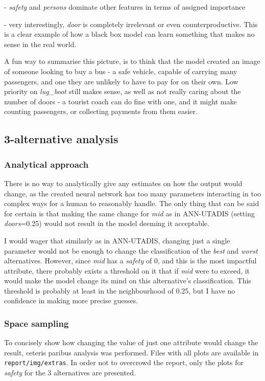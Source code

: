 \documentclass[../main.tex]{subfiles}
\begin{document}
- \emph{safety} and \emph{persons} dominate other features in terms of assigned importance

- very interestingly, \emph{door} is completely irrelevant or even counterproductive. This is
a clear example of how a black box model can learn something that makes no sense in the real world.

A fun way to summarise this picture, is to think that the model created an image of someone
looking to buy a bus - a safe vehicle, capable of carrying many passengers, and one they are
unlikely to have to pay for on their own. Low priority on \emph{lug\_boot} still makes sense,
as well as not really caring about the number of doors - a tourist coach can do fine with one,
and it might make counting passengers, or collecting payments from them easier.

\subsection{3-alternative analysis}

\subsubsection{Analytical approach}

There is no way to analytically give any estimates on how the output would change,
as the created neural network has too many parameters interacting in too complex
ways for a human to reasonably handle. The only thing that can be said for certain
is that making the same change for \emph{mid} as in ANN-UTADIS (setting \emph{doors}=0.25)
would not result in the model deeming it acceptable.

I would wager that similarly as in ANN-UTADIS, changing just a single parameter would not
be enough to change the classification of the \emph{best} and \emph{worst} alternatives.
However, since \emph{mid} has a \emph{safety} of 0, and this is the most impactful attribute,
there probably exists a threshold on it that if \emph{mid} were to exceed, it
would make the model change its mind on this alternative's classification.
This threshold is probably at least in the neighbourhood of 0.25, but I have no confidence
in making more precise guesses.

\subsubsection{Space sampling}
To concisely show how changing the value of just one attribute would change the result, ceteris paribus analysis
was performed.
Files with all plots are available in \verb|report/img/extras|. In order not to overcrowd the report,
only the plots for \emph{safety} for the 3 alternatives are presented.
\end{document}
